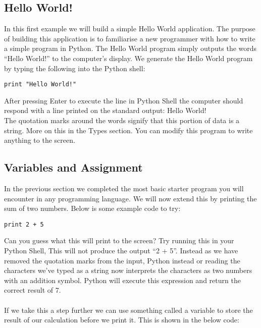 \documentclass[twocolumn]{article}
\begin{document}
\subsection{Hello World!}

In this first example we will build a simple Hello World application. The purpose of building this application is to familiarise a new programmer with how to write a simple program in Python. The Hello World program simply outputs the words ``Hello World!'' to the computer's display. We generate the Hello World program by typing the following into the Python shell:\\
\begin{lstlisting}
print "Hello World!"
\end{lstlisting}
After pressing Enter to execute the line in Python Shell the computer should respond with a line printed on the standard output: Hello World!\\ The quotation marks around the words signify that this portion of data is a string. More on this in the Types section. You can modify this program to write anything to the screen.


\subsection{Variables and Assignment}

In the previous section we completed the most basic starter program you will encounter in any programming language. We will now extend this by printing the sum of two numbers. Below is some example code to try:

\begin{lstlisting}
print 2 + 5
\end{lstlisting}
Can you guess what this will print to the screen? Try running this in your Python Shell, This will not produce the output ``2 + 5''. Instead as we have removed the quotation marks from the input, Python instead or reading the characters we've typed as a string now interprets the characters as two numbers with an addition symbol. Python will execute this expression and return the correct result of 7. \\
\\
If we take this a step further we can use something called a variable to store the result of our calculation before we print it. This is shown in the below code:
\end{document}
